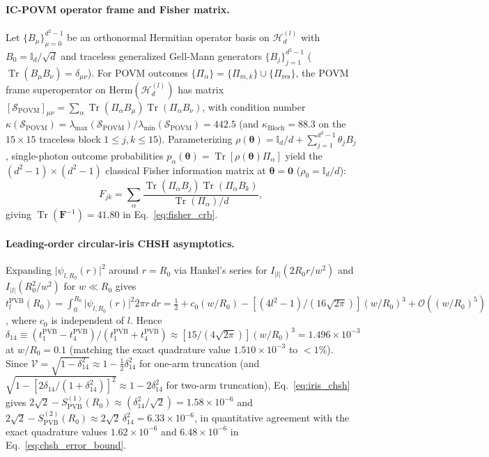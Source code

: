 \documentclass[aps,pra,reprint,nofootinbib,floatfix,longbibliography]{revtex4-2}
\newcommand{\abs}[1]{\lvert #1 \rvert}
\begin{document}
\paragraph*{IC-POVM operator frame and Fisher matrix.}
Let $\{B_\mu\}_{\mu=0}^{d^2-1}$ be an orthonormal Hermitian operator basis on $\mathcal{H}_d^{(l)}$ with $B_0 = \mathbb{I}_d/\sqrt{d}$ and traceless generalized Gell-Mann generators $\{B_j\}_{j=1}^{d^2-1}$ ($\operatorname{Tr}(B_\mu B_\nu) = \delta_{\mu\nu}$). For POVM outcomes $\{\Pi_\alpha\} = \{\Pi_{m,k}\} \cup \{\Pi_{\mathrm{res}}\}$, the POVM frame superoperator on $\mathrm{Herm}(\mathcal{H}_d^{(l)})$ has matrix $[\mathcal{S}_{\mathrm{POVM}}]_{\mu\nu} = \sum_\alpha \operatorname{Tr}(\Pi_\alpha B_\mu)\operatorname{Tr}(\Pi_\alpha B_\nu)$, with condition number $\kappa(\mathcal{S}_{\mathrm{POVM}}) = \lambda_{\max}(\mathcal{S}_{\mathrm{POVM}})/\lambda_{\min}(\mathcal{S}_{\mathrm{POVM}}) = 442.5$ (and $\kappa_{\mathrm{Bloch}} = 88.3$ on the $15\times 15$ traceless block $1 \le j,k \le 15$). Parameterizing $\rho(\boldsymbol{\theta}) = \mathbb{I}_d/d + \sum_{j=1}^{d^2-1}\theta_j B_j$, single-photon outcome probabilities $p_\alpha(\boldsymbol{\theta}) = \operatorname{Tr}[\rho(\boldsymbol{\theta})\Pi_\alpha]$ yield the $(d^2-1)\times(d^2-1)$ classical Fisher information matrix at $\boldsymbol{\theta} = \mathbf{0}$ ($\rho_0 = \mathbb{I}_d/d$):
\begin{equation}
F_{jk} = \sum_\alpha \frac{\operatorname{Tr}(\Pi_\alpha B_j)\operatorname{Tr}(\Pi_\alpha B_k)}{\operatorname{Tr}(\Pi_\alpha)/d},
\label{eq:app_fisher}
\end{equation}
giving $\operatorname{Tr}(\mathbf{F}^{-1}) = 41.80$ in Eq.~\eqref{eq:fisher_crb}.

\paragraph*{Leading-order circular-iris CHSH asymptotics.}
Expanding $\abs{\psi_{l,R_0}(r)}^2$ around $r = R_0$ via Hankel's series for $I_{\abs{l}}(2R_0 r/w^2)$ and $I_{\abs{l}}(R_0^2/w^2)$ for $w \ll R_0$ gives $t_l^{\mathrm{PVB}}(R_0) = \int_0^{R_0}\abs{\psi_{l,R_0}(r)}^2 2\pi r\,dr = \frac{1}{2} + c_0(w/R_0) - [(4l^2 - 1)/(16\sqrt{2\pi})](w/R_0)^3 + \mathcal{O}((w/R_0)^5)$, where $c_0$ is independent of $l$. Hence $\delta_{14} \equiv (t_1^{\mathrm{PVB}} - t_4^{\mathrm{PVB}})/(t_1^{\mathrm{PVB}} + t_4^{\mathrm{PVB}}) \approx [15/(4\sqrt{2\pi})](w/R_0)^3 = 1.496\times 10^{-3}$ at $w/R_0 = 0.1$ (matching the exact quadrature value $1.510\times 10^{-3}$ to $<1\%$). Since $\mathcal{V} = \sqrt{1 - \delta_{14}^2} \approx 1 - \frac{1}{2}\delta_{14}^2$ for one-arm truncation (and $\sqrt{1 - [2\delta_{14}/(1+\delta_{14}^2)]^2} \approx 1 - 2\delta_{14}^2$ for two-arm truncation), Eq.~\eqref{eq:iris_chsh} gives $2\sqrt{2} - S_{\mathrm{PVB}}^{(1)}(R_0) \approx (\delta_{14}^2/\sqrt{2}) = 1.58\times 10^{-6}$ and $2\sqrt{2} - S_{\mathrm{PVB}}^{(2)}(R_0) \approx 2\sqrt{2}\,\delta_{14}^2 = 6.33\times 10^{-6}$, in quantitative agreement with the exact quadrature values $1.62\times 10^{-6}$ and $6.48\times 10^{-6}$ in Eq.~\eqref{eq:chsh_error_bound}.


\end{document}
